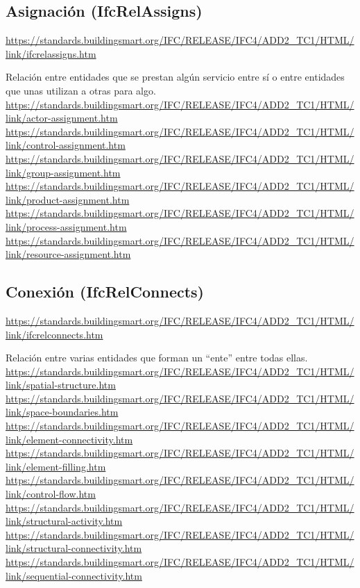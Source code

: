 \documentclass[spanish,12pt,a4paper,final,oneside]{book}
\begin{document}
\subsection{Asignación (IfcRelAssigns)}
\url{https://standards.buildingsmart.org/IFC/RELEASE/IFC4/ADD2_TC1/HTML/link/ifcrelassigns.htm}

Relación entre entidades que se prestan algún servicio entre sí o entre  entidades que unas utilizan a otras para algo.
\\ \url{https://standards.buildingsmart.org/IFC/RELEASE/IFC4/ADD2_TC1/HTML/link/actor-assignment.htm}
\\ \url{https://standards.buildingsmart.org/IFC/RELEASE/IFC4/ADD2_TC1/HTML/link/control-assignment.htm}
\\ \url{https://standards.buildingsmart.org/IFC/RELEASE/IFC4/ADD2_TC1/HTML/link/group-assignment.htm}
\\ \url{https://standards.buildingsmart.org/IFC/RELEASE/IFC4/ADD2_TC1/HTML/link/product-assignment.htm}
\\ \url{https://standards.buildingsmart.org/IFC/RELEASE/IFC4/ADD2_TC1/HTML/link/process-assignment.htm}
\\ \url{https://standards.buildingsmart.org/IFC/RELEASE/IFC4/ADD2_TC1/HTML/link/resource-assignment.htm}

\subsection{Conexión (IfcRelConnects)}
\url{https://standards.buildingsmart.org/IFC/RELEASE/IFC4/ADD2_TC1/HTML/link/ifcrelconnects.htm}

Relación entre varias entidades que forman un ``ente'' entre todas ellas.
\\ \url{https://standards.buildingsmart.org/IFC/RELEASE/IFC4/ADD2_TC1/HTML/link/spatial-structure.htm}
\\ \url{https://standards.buildingsmart.org/IFC/RELEASE/IFC4/ADD2_TC1/HTML/link/space-boundaries.htm}
\\ \url{https://standards.buildingsmart.org/IFC/RELEASE/IFC4/ADD2_TC1/HTML/link/element-connectivity.htm}
\\ \url{https://standards.buildingsmart.org/IFC/RELEASE/IFC4/ADD2_TC1/HTML/link/element-filling.htm}
\\ \url{https://standards.buildingsmart.org/IFC/RELEASE/IFC4/ADD2_TC1/HTML/link/control-flow.htm}
\\ \url{https://standards.buildingsmart.org/IFC/RELEASE/IFC4/ADD2_TC1/HTML/link/structural-activity.htm}
\\ \url{https://standards.buildingsmart.org/IFC/RELEASE/IFC4/ADD2_TC1/HTML/link/structural-connectivity.htm}
\\ \url{https://standards.buildingsmart.org/IFC/RELEASE/IFC4/ADD2_TC1/HTML/link/sequential-connectivity.htm}
\end{document}
